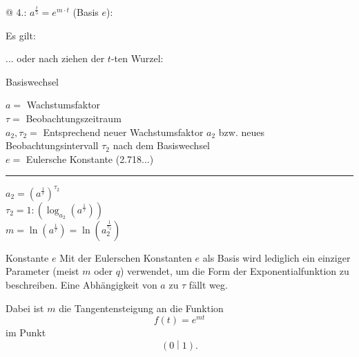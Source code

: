 @ 4.: $a^\frac{t}5 = e^{m\cdot{}t}$ (Basis $e$):

\newpage

\begin{center}
  \end{center}

Es gilt:
\begin{center}
\end{center}

... oder nach ziehen der $t$-ten Wurzel:

\begin{gesetz}{Basiswechsel}{}

  \begin{center}\end{center}

 
  $a=$ Wachstumsfaktor\\
  $\tau=$ Beobachtungszeitraum\\
  $a_2, \tau_2=$ Entsprechend neuer Wachstumsfaktor $a_2$ bzw. neues
  Beobachtungsintervall $\tau_2$ nach dem Basiswechsel\\
  $e=$ Eulersche Konstante (2.718...)\\
  \hrule
  $a_2 = \left(a^\frac1\tau\right)^{\tau_2}$\\
  $\tau_2=1 : \left(\log_{a_2}\left(a^\frac1\tau\right)\right)$\\
  $m=\ln\left(a^\frac1\tau\right) =  \ln\left(a_2^\frac1{\tau_2}\right)$\\
\end{gesetz}

\begin{bemerkung}{Konstante $e$}{}
  Mit der Eulerschen Konstanten $e$ als Basis wird lediglich ein einziger
  Parameter (meist $m$ oder $q$) verwendet, um die Form der
  Exponentialfunktion zu beschreiben. Eine Abhängigkeit von $a$ zu
  $\tau$ fällt weg.

  Dabei ist $m$ die Tangentensteigung an die Funktion $$f(t) = e^{mt}$$
  im Punkt $$\left(0\middle|1\right).$$
  \end{bemerkung}
\newpage

